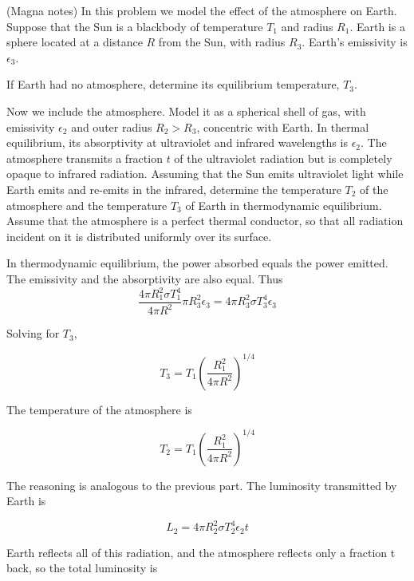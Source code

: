 \documentclass[11pt]{article}
\begin{document}
\begin{pproblem} (Magna notes)
    In this problem we model the effect of the atmosphere on Earth. Suppose that the Sun
is a blackbody of temperature \(T_1\) and radius \(R_1\). Earth is a sphere located
at a distance \(R\) from the Sun, with radius \(R_3\). Earth's emissivity is \(\epsilon_3\).
\begin{alternativas}
    \item If Earth had no atmosphere, determine its equilibrium temperature, \(T_3\).
    \item  Now we include the atmosphere. Model it as a spherical shell of gas,
    with emissivity \(\epsilon_2\) and outer radius \(R_2>R_3\), concentric with Earth. In thermal equilibrium,
    its absorptivity at ultraviolet and infrared wavelengths is \(\epsilon_2\). The
    atmosphere transmits a fraction \(t\) of the ultraviolet radiation but is completely opaque to
    infrared radiation. Assuming that the Sun emits ultraviolet light while Earth emits and re-emits
    in the infrared, determine the temperature \(T_2\) of the atmosphere and the temperature \(T_3\) of Earth in thermodynamic
    equilibrium. Assume that the atmosphere is a perfect thermal conductor, so that
    all radiation incident on it is distributed uniformly over its surface.
\end{alternativas}

\begin{pssolution*}{}{}
    \begin{alternativas}
        \item In thermodynamic equilibrium, the power absorbed equals the power emitted. The emissivity and the absorptivity are also equal. Thus
        \[\frac{4\pi R_1^2\sigma T_1^4}{4\pi R^2}\pi R_3^2\epsilon_3 = 4\pi R_3^2\sigma T_3^4\epsilon_3\]

        Solving for \(T_3\),

        \[\boxed{T_3 = T_1\left(\frac{R_1^2}{4\pi R^2}\right)^{1/4}}\]

         \item The temperature of the atmosphere is
         
         \[T_2 = T_1\left(\frac{R_1^2}{4\pi R^2 }\right)^{1/4}\]

         The reasoning is analogous to the previous part. The luminosity transmitted by Earth is

         \[L_2 = {4\pi R_2^2\sigma T_2^4\epsilon_2} t\]

         Earth reflects all of this radiation, and the atmosphere reflects only a fraction t back, so the total luminosity is


\end{alternativas}
\end{pssolution*}
\end{pproblem}
\end{document}
